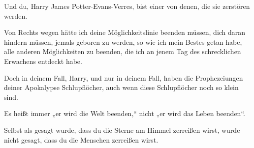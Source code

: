 \begin{writtenNote}
Und du, Harry James Potter-Evans-Verres, bist einer von denen, die sie zerstören werden.

Von Rechts wegen hätte ich deine Möglichkeitslinie beenden müssen, dich daran hindern müssen, jemals geboren zu werden, so wie ich mein Bestes getan habe, alle anderen Möglichkeiten zu beenden, die ich an jenem Tag des schrecklichen Erwachens entdeckt habe.

Doch in deinem Fall, Harry, und nur in deinem Fall, haben die Prophezeiungen deiner Apokalypse Schlupflöcher, auch wenn diese Schlupflöcher noch so klein sind.

Es heißt immer „er wird die Welt beenden,“ nicht „er wird das Leben beenden“.

Selbst als gesagt wurde, dass du die Sterne am Himmel zerreißen wirst, wurde nicht gesagt, dass du die Menschen zerreißen wirst.


\end{writtenNote}
